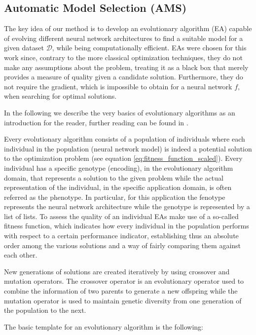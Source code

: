 \documentclass[journal]{IEEEtran}
\begin{document}
\subsection{Automatic Model Selection (AMS)}

The key idea of our method is to develop an evolutionary algorithm (EA) capable of evolving different neural network architectures to find a suitable model for a given dataset $\mathcal{D}$, while being computationally efficient. EAs were chosen for this work since, contrary to the more classical optimization techniques, they do not make any assumptions about the problem, treating it as a black box that merely provides a measure of quality given a candidate solution.  Furthermore, they do not require the gradient, which is impossible to obtain for a neural network $f,$ when searching for optimal solutions.

In the following we describe the very basics of evolutionary algorithms as an introduction for the reader, further reading can be found in \cite{Engelbrecht, Ebehart2007, Sumathi2010}. 

Every evolutionary algorithm consists of a population of individuals where each individual in the population (neural network model) is indeed a potential solution to the optimization problem (see equation \ref{eq:fitness_function_scaled}). Every individual has a specific genotype (encoding), in the evolutionary algorithm domain, that represents a solution to the given problem while the actual representation of the individual, in the specific application domain, is often referred as the phenotype. In particular, for this application  the fenotype represents the neural network architecture while the genotype is represented by a list of lists. To assess the quality of an individual EAs make use of a so-called fitness function, which indicates how every individual in the population performs with respect to a certain performance indicator, establishing thus an absolute order among the various solutions and a way of fairly comparing them against each other. 

New generations of solutions are created iteratively by using crossover and mutation operators. The crossover operator is an evolutionary operator used to combine the information of two parents to generate a new offspring while the mutation operator is used to maintain genetic diversity from one generation of the population to the next.

The basic template for an evolutionary algorithm is the following:
\end{document}
